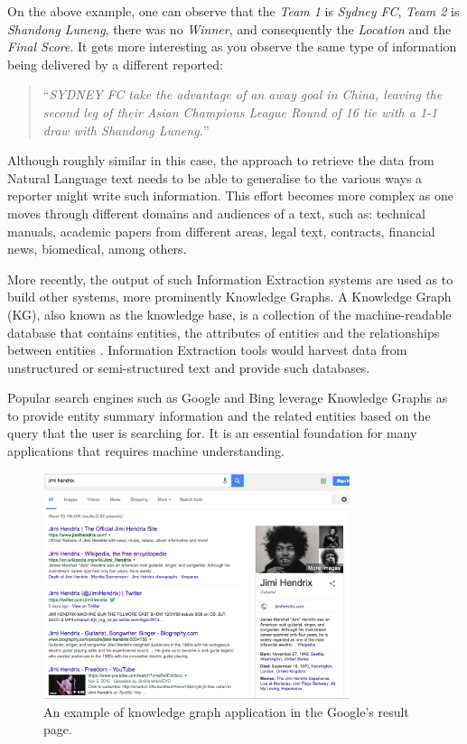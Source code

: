 \documentclass[11pt,a4paper,openright]{memoir}
\begin{document}
On the above example, one can observe that the \emph{Team 1} is \emph{Sydney FC}, \emph{Team 2} is \emph{Shandong Luneng}, there was no \emph{Winner}, and consequently the \emph{Location} and the \emph{Final Score}. It gets more interesting as you observe the same type of information being delivered by a different reported:

\blockquote{\enquote{\emph{SYDNEY FC take the advantage of an away goal in China, leaving the second leg of their Asian Champions League Round of 16 tie with a 1-1 draw with Shandong Luneng.}}}

Although roughly similar in this case, the approach to retrieve the data from Natural Language text needs to be able to generalise to the various ways a reporter might write such information. This effort becomes more complex as one moves through different domains and audiences of a text, such as: technical manuals, academic papers from different areas, legal text, contracts, financial news, biomedical, among others.

More recently, the output of such Information Extraction systems are used as to build other systems, more prominently Knowledge Graphs. A Knowledge Graph (KG), also known as the knowledge base, is a collection of the machine-readable database that contains entities, the attributes of entities and the relationships between entities \cite{google}. Information Extraction tools would harvest data from unstructured or semi-structured text and provide such databases.

Popular search engines such as Google \cite{google} and Bing \cite{bing} leverage Knowledge Graphs as to provide entity summary information and the related entities based on the query that the user is searching for. It is an essential foundation for many applications that requires machine understanding.

\begin{figure}[!htbp]
  \centering
    \includegraphics[width=0.8\textwidth]{./images/google_knowledge_graph}
  \caption[An example of knowledge graph application.]{An example of knowledge graph application in the Google's result page.}
  \label{fig:google_knowledge_graph}
\end{figure}
\end{document}
